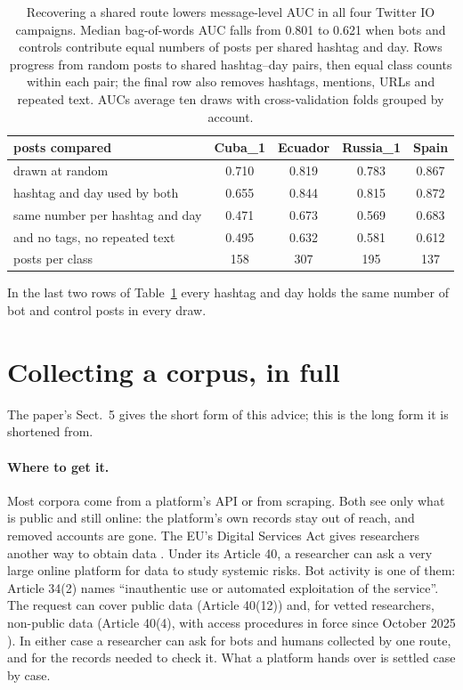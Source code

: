 \documentclass[10pt,a4paper]{article}
\begin{document}
\begin{table}[t]\centering\small
\begin{tabular}{lcccc}
\toprule
posts compared & Cuba\_1 & Ecuador & Russia\_1 & Spain \\
\midrule
drawn at random                  & 0.710 & 0.819 & 0.783 & 0.867 \\
hashtag and day used by both     & 0.655 & 0.844 & 0.815 & 0.872 \\
same number per hashtag and day  & 0.471 & 0.673 & 0.569 & 0.683 \\
\quad and no tags, no repeated text & 0.495 & 0.632 & 0.581 & 0.612 \\
\addlinespace
posts per class                  & 158 & 307 & 195 & 137 \\
\bottomrule
\end{tabular}
\caption{Recovering a shared route lowers message-level AUC in all four Twitter IO campaigns.
Median bag-of-words AUC falls from 0.801 to 0.621 when bots and controls contribute equal numbers
  of posts per shared hashtag and day.
Rows progress from random posts to shared hashtag--day pairs, then equal class counts within
  each pair; the final row also removes hashtags, mentions, URLs and repeated text.
AUCs average ten draws with cross-validation folds grouped by account.}
\label{tab:iomatch}
\end{table}
In the last two rows of Table~\ref{tab:iomatch} every hashtag and day holds the same number of bot and control
  posts in every draw.

\section{Collecting a corpus, in full}\label{app:collect}
The paper's Sect.~5 gives the short form of this advice; this is the long form it is shortened from.

\paragraph{Where to get it.}
Most corpora come from a platform's API or from scraping.
Both see only what is public and still online: the platform's own records stay out of reach, and
  removed accounts are gone.
The EU's Digital Services Act gives researchers another way to obtain data
  \citep{eu2022dsa}.
Under its Article 40, a researcher can ask a very large online platform for data to study
  systemic risks.
Bot activity is one of them: Article 34(2) names ``inauthentic use or automated exploitation of
  the service''.
The request can cover public data (Article 40(12)) and, for vetted researchers, non-public data
  (Article 40(4), with access procedures in force since October 2025
  \citep{eu2025dataaccess}).
In either case a researcher can ask for bots and humans collected by one route, and for the
  records needed to check it.
What a platform hands over is settled case by case.
\end{document}
